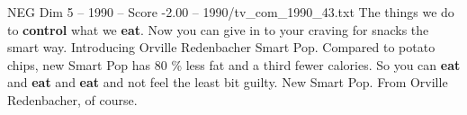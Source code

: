 \begin{textsample}{NEG Dim 5 – 1990 – Score -2.00 – 1990/tv\_com\_1990\_43.txt}  \label{ex:f5_neg_076}
The things we do to \textbf{control} what we \textbf{eat}.
Now you can give in to your craving for snacks the smart way.
Introducing Orville Redenbacher Smart Pop.
Compared to potato chips, new Smart Pop has 80 \% less fat and a third fewer calories.
So you can \textbf{eat} and \textbf{eat} and \textbf{eat} and not feel the least bit guilty.
New Smart Pop.
From Orville Redenbacher, of course.

\end{textsample}
